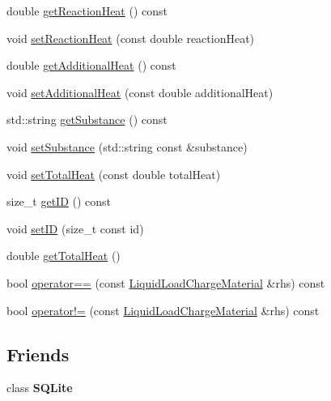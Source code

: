 \begin{DoxyCompactItemize}
\item 
double \hyperlink{class_liquid_load_charge_material_a2f0c26e789e98efd1e8fd0c8741ddd92}{get\+Reaction\+Heat} () const
\item 
void \hyperlink{class_liquid_load_charge_material_a793c7ebc2643b2af0eaf21b9cb788775}{set\+Reaction\+Heat} (const double reaction\+Heat)
\item 
double \hyperlink{class_liquid_load_charge_material_a6b79cd1aec59a7f7119a8abfa9e5859b}{get\+Additional\+Heat} () const
\item 
void \hyperlink{class_liquid_load_charge_material_a557c1f588cfb972ff0c7f748d6c2bd8f}{set\+Additional\+Heat} (const double additional\+Heat)
\item 
std\+::string \hyperlink{class_liquid_load_charge_material_a8f925c04c15ed889ba3fd7c4b628dbff}{get\+Substance} () const
\item 
void \hyperlink{class_liquid_load_charge_material_a85bb43270c6a11a1eaf51f00da16746a}{set\+Substance} (std\+::string const \&substance)
\item 
void \hyperlink{class_liquid_load_charge_material_ad45afc317b72c89cc46016e0b05b50b3}{set\+Total\+Heat} (const double total\+Heat)
\item 
size\+\_\+t \hyperlink{class_liquid_load_charge_material_a07e869cabd98a5179536559a1c0f4b35}{get\+ID} () const
\item 
void \hyperlink{class_liquid_load_charge_material_a3f6654f1d9387366e0ca7620ecc41361}{set\+ID} (size\+\_\+t const id)
\item 
double \hyperlink{class_liquid_load_charge_material_a51a9826325e2c34cd073b8766331d476}{get\+Total\+Heat} ()
\item 
bool \hyperlink{class_liquid_load_charge_material_ad2090d1628f26e46339e9e164b47d3a2}{operator==} (const \hyperlink{class_liquid_load_charge_material}{Liquid\+Load\+Charge\+Material} \&rhs) const
\item 
bool \hyperlink{class_liquid_load_charge_material_aa6ad825ee8ab1c7816ce3bf10260c0bb}{operator!=} (const \hyperlink{class_liquid_load_charge_material}{Liquid\+Load\+Charge\+Material} \&rhs) const
\end{DoxyCompactItemize}
\subsection*{Friends}
\begin{DoxyCompactItemize}
\item 
\mbox{\label{class_liquid_load_charge_material_a0102f3b3c0cbf96db6c49f071fa5e7cc}} 
class {\bfseries S\+Q\+Lite}
\end{DoxyCompactItemize}


